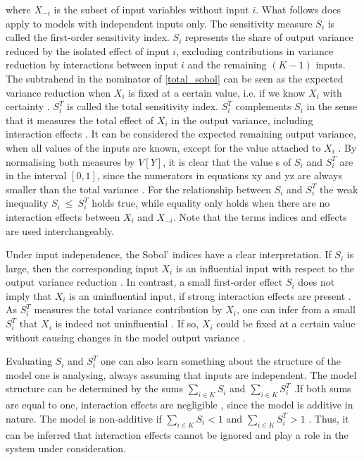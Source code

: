 where $X_{- i}$ is the subset of input variables without input $i$. What follows does apply to models with independent inputs only. The sensitivity measure $S_i$ is called the first-order sensitivity index. $S_i$ represents the share of output variance reduced by the isolated effect of input $i$, excluding contributions in variance reduction by interactions between input $i$ and the remaining $(K-1)$ inputs. The subtrahend in the nominator of \cref{total_sobol} can be seen as the expected variance reduction when $X_i$ is fixed at a certain value, i.e. if we know $X_i$ with certainty \citep{SNS16}. $S_i^T$ is called the total sensitivity index. $S_i^T$ complements $S_i$ in the sense that it measures the total effect of $X_i$ in the output variance, including interaction effects \citep{SNS16}. It can be considered the expected remaining output variance, when all values of the inputs are known, except for the value attached to $X_i$ \citep{SNS16}. By normalising both measures by $V[Y]$, it is clear that the value s of $S_i$ and $S_i^T$ are in the interval $[0, 1]$, since the numerators in equations xy and yz are always smaller than the total variance \citep{GM17}. For the relationship between $S_i$ and $S_i^T$ the weak inequality $S_i\ \le\ S_i^T$ holds true, while equality only holds when there are no interaction effects between $X_i$ and $X_{- i}$. Note that the terms indices and effects are used interchangeably.

Under input independence, the Sobol' indices have a clear interpretation. If $S_i$ is large, then the corresponding input $X_i$ is an influential input with respect to the output variance reduction \citep{GM17}. In contrast, a small first-order effect $S_i$ does not imply that $X_i$ is an uninfluential input, if strong interaction effects are present \citep{GM17}. As $S_i^T$ measures the total variance contribution by $X_i$, one can infer from a small $S_i^T$ that $X_i$ is indeed not uninfluential \citep{GM17}. If so, $X_i$ could be fixed at a certain value without causing changes in the model output variance \citep{GM17}.

Evaluating $S_i$ and $S_i^T$ one can also learn something about the structure of the model one is analysing, always assuming that inputs are independent. The model structure can be determined by the sums $\sum_{i \in K} S_i$ and $\sum_{i \in K} S_i^T$ \citep{GM17}.If both sums are equal to one, interaction effects are negligible , since the model is additive in nature. The model is non-additive if $\sum_{i \in K} S_i < 1$ and $\sum_{i \in K} S_i^T > 1$ \citep{GM17}. Thus, it can be inferred that interaction effects cannot be ignored and play a role in the system under consideration.

